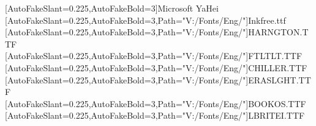 \usepackage{xparse}

\usepackage{xltxtra}

\usepackage{etoolbox}

\usepackage{setspace}

\usepackage{fontspec}
\setmainfont[Path="V:/Fonts/Eng/",AutoFakeBold=3,AutoFakeSlant=0.25]{BASKVILL.TTF}
\setsansfont[Path="V:/Fonts/Eng/",AutoFakeBold=3,AutoFakeSlant=0.25]{POORICH.TTF}
\setmonofont[Path="V:/Fonts/Eng/",AutoFakeBold=3,AutoFakeSlant=0.25]{cour.ttf}

\usepackage{xeCJK}

\newfontfamily{\yh}[AutoFakeSlant=0.225,AutoFakeBold=3]{Microsoft YaHei}
\newfontfamily{\fontik}[AutoFakeSlant=0.225,AutoFakeBold=3,Path="V:/Fonts/Eng/"]{Inkfree.ttf}
\newfontfamily{\fontss}[AutoFakeSlant=0.225,AutoFakeBold=3,Path="V:/Fonts/Eng/"]{HARNGTON.TTF}
\newfontfamily{\fontfl}[AutoFakeSlant=0.225,AutoFakeBold=3,Path="V:/Fonts/Eng/"]{FTLTLT.TTF}
\newfontfamily{\fontch}[AutoFakeSlant=0.225,AutoFakeBold=3,Path="V:/Fonts/Eng/"]{CHILLER.TTF}
\newfontfamily{\fontrm}[AutoFakeSlant=0.225,AutoFakeBold=3,Path="V:/Fonts/Eng/"]{ERASLGHT.TTF}
\newfontfamily{\fontbk}[AutoFakeSlant=0.225,AutoFakeBold=3,Path="V:/Fonts/Eng/"]{BOOKOS.TTF}
\newfontfamily{\fontlr}[AutoFakeSlant=0.225,AutoFakeBold=3,Path="V:/Fonts/Eng/"]{LBRITEI.TTF}

\usepackage{amsmath,amssymb,amsthm,amsfonts,mathrsfs}
\usepackage{mathtools}
\usepackage{physics}
\usepackage{esint}
\usepackage{bm}

\usepackage{xcolor}

\usepackage{colortbl}
\usepackage{makecell}
\usepackage{multirow}
\usepackage{longtable}
\usepackage{booktabs}






